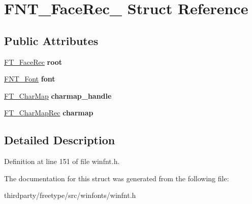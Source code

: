 \hypertarget{struct_f_n_t___face_rec__}{}\section{F\+N\+T\+\_\+\+Face\+Rec\+\_\+ Struct Reference}
\label{struct_f_n_t___face_rec__}
\subsection*{Public Attributes}
\begin{DoxyCompactItemize}
\item 
\mbox{\label{struct_f_n_t___face_rec___a88b68485291640b88ee2b92be5b15e33}} 
\hyperlink{struct_f_t___face_rec__}{F\+T\+\_\+\+Face\+Rec} {\bfseries root}
\item 
\mbox{\label{struct_f_n_t___face_rec___a082a4d95b48501401679a71abba61be6}} 
\hyperlink{struct_f_n_t___font_rec__}{F\+N\+T\+\_\+\+Font} {\bfseries font}
\item 
\mbox{\label{struct_f_n_t___face_rec___acf50d9a81fb2628587eaa357e9e26e5b}} 
\hyperlink{struct_f_t___char_map_rec__}{F\+T\+\_\+\+Char\+Map} {\bfseries charmap\+\_\+handle}
\item 
\mbox{\label{struct_f_n_t___face_rec___a1fa945a0394c8236ce9b41e01eefc5bf}} 
\hyperlink{struct_f_t___char_map_rec__}{F\+T\+\_\+\+Char\+Map\+Rec} {\bfseries charmap}
\end{DoxyCompactItemize}


\subsection{Detailed Description}


Definition at line 151 of file winfnt.\+h.



The documentation for this struct was generated from the following file\+:\begin{DoxyCompactItemize}
\item 
thirdparty/freetype/src/winfonts/winfnt.\+h\end{DoxyCompactItemize}

